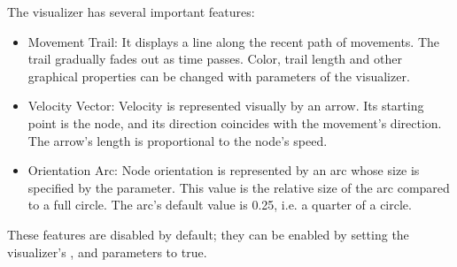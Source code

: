 The visualizer has several important features:

\begin{itemize}
  \item Movement Trail: It displays a line along the recent path of movements.
        The trail gradually fades out as time passes. Color, trail length and
        other graphical properties can be changed with parameters of the
        visualizer.
  \item Velocity Vector: Velocity is represented visually by an arrow. Its
        starting point is the node, and its direction coincides with the
        movement's direction. The arrow's length is proportional to the node's
       speed.
  \item Orientation Arc: Node orientation is represented by an arc whose size
       is specified by the  parameter. This value is the
       relative size of the arc compared to a full circle. The arc's default
       value is 0.25, i.e. a quarter of a circle.
\end{itemize}

These features are disabled by default; they can be enabled by setting the
visualizer's ,  and
 parameters to true.




